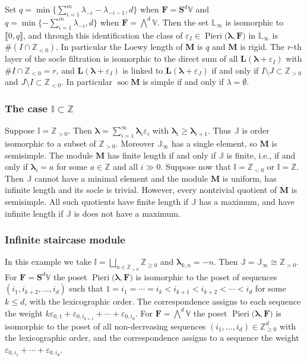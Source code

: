 \documentclass[11pt,fleqn]{amsart}
\newcommand\ZZ{\mathbb Z}
\newcommand\II{\mathbb I}
\newcommand\JJ{\mathbb J}
\newcommand\LL{\mathbb L}
\renewcommand\epsilon{\varepsilon}
\theoremstyle{definition}
\theoremstyle{remark}
\theoremstyle{remark}
\newcommand\VV{\mathbb V}
\renewcommand\SS{\mathbf S}
\newcommand\interval[1]{\llbracket{#1}\rrbracket}
\newcommand\wt[1]{\boldsymbol{#1}}
\DeclareMathOperator\soc{soc}
\newcommand\Pieri[2]{\operatorname{Pieri}{(#1},{#2)}}
\begin{document}
Set $q = \min\{\sum_{i=1}^m \lambda_{-i} - \lambda_{-i-1}, d\}$ when $\mathbf F 
= \SS^d \VV$ and $q = \min\{-\sum_{i=1}^m \lambda_{-i},d\}$ when $\mathbf F = 
\bigwedge^d \VV$. Then the set $\LL_\infty$ is isomorphic to $\interval{0,q}$, 
and through this identification the class of $\epsilon_I \in \Pieri{\wt\lambda}
{\mathbf F}$ in $\LL_\infty$ is $\# (I \cap \ZZ_{<0})$. In particular the Loewy 
length of $\mathbf M$ is $q$ and $\mathbf M$ is rigid. The $r$-th layer of the 
socle filtration is isomorphic to the direct sum of all $\mathbf L(\wt\lambda + 
\epsilon_I)$ with $\# I\cap \ZZ_{<0} = r$, and $\mathbf L(\wt\lambda + 
\epsilon_I)$ is linked to $\mathbf L(\wt\lambda + \epsilon_J)$ if and only if 
$I \setminus J \subset \ZZ_{>0}$ and $J \setminus I \subset \ZZ_{<0}$. In 
particular $\soc \mathbf M$ is simple if and only if $\lambda = \emptyset$.

\subsubsection{The case $\II \subset \ZZ$}
Suppose $\II = \ZZ_{>0}$. Then $\wt\lambda = \sum_{i=1}^\infty \wt\lambda_i 
\epsilon_i$ with $\wt\lambda_i \geq \wt\lambda_{i+1}$. Thus $\JJ$ is order 
isomorphic to a subset of $\ZZ_{>0}$. Moreover $\JJ_\infty$ has a single 
element, so  $\mathbf M$ is semisimple. The module $\mathbf M$ has finite 
length if and only if $\JJ$ is finite, i.e., if and only if $\wt\lambda_i = a$ 
for some $a \in \ZZ$ and all $i \gg 0$. Suppose now that $\II = \ZZ_{<0}$ or 
$\II = \ZZ$. Then $\JJ$ cannot have a minimal element and the module 
$\mathbf M$ is uniform, has infinite length and its socle is trivial. However, 
every nontrivial quotient of $\mathbf M$ is semisimple. All such quotients have 
finite length if $\JJ$ has a maximum, and have infinite length if $\JJ$ is does 
not have a maximum.

\subsubsection{Infinite staircase module}
In this example we take $\II = \bigsqcup_{n \in \ZZ_{> 0}} \ZZ_{\geq 0}$ and 
$\wt \lambda_{k,n} = -n$. Then $\JJ = \JJ_{\infty} \cong \ZZ_{>0}$. For 
$\mathbf F = \SS^d\VV$ the poset $\Pieri{\wt\lambda}{\mathbf F}$ is 
isomorphic to the poset of sequences $(i_{1}, i_{k+2}, \ldots, i_{d})$ 
such that $1 = i_1 = \cdots = i_k < i_{k+1} < i_{k+2} < \cdots < i_d$ for some 
$k \leq d$, with the lexicographic order. The correspondence assigns to each 
sequence the weight $k \epsilon_{0,1} + \epsilon_{0,i_{k+1}} + \cdots + 
\epsilon_{0,i_{d}}$. For $\mathbf F = \bigwedge^d \VV$ the poset 
$\Pieri{\wt\lambda}{\mathbf F}$ is isomorphic to the poset of all 
non-decreasing sequences $(i_1, \ldots, i_d) \in \ZZ_{\geq 0}^d$ with the 
lexicographic order, and the correspondence assigns to a sequence the weight
$\epsilon_{0,i_1} + \cdots + \epsilon_{0,i_d}$.
\end{document}

